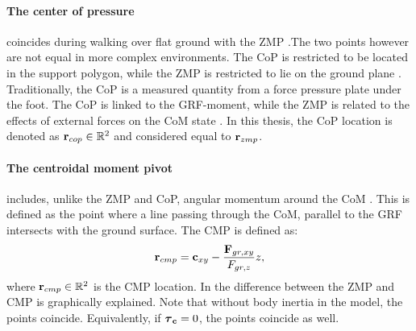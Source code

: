 \paragraph{The center of pressure} coincides during walking over flat ground with the \ac{ZMP} \cite{vukobratovic2004zero}.The two points however are not equal in more complex environments. The \ac{CoP} is restricted to be located in the support polygon, while the \ac{ZMP} is restricted to lie on the ground plane  \cite{sardain2004forces}. Traditionally, the \ac{CoP} is a measured quantity from a force pressure plate under the foot. The \ac{CoP} is linked to the \ac{GRF}-moment, while the \ac{ZMP} is related to the effects of external forces on the \ac{CoM} state \cite{sardain2004forces}. In this thesis, the \ac{CoP} location is denoted as $\mathbf{r}_{cop} \in \mathbb{R}^2$ and considered equal to $\mathbf{r}_{zmp}$.

\paragraph{The centroidal moment pivot} includes, unlike the \ac{ZMP} and \ac{CoP}, angular momentum around the \ac{CoM}  \cite{popovic2005ground}. This is defined as the point where a line passing through the \ac{CoM}, parallel to the \ac{GRF} intersects with the ground surface. The \ac{CMP} is defined as:
\begin{equation}
    \mathbf{r}_{cmp}=\mathbf{c}_{xy}-\frac{\mathbf{F}_{gr,xy}}{F_{gr,z}}z,
    \label{eq:cmp}
\end{equation}
where $\mathbf{r}_{cmp} \in \mathbb{R}^2$ is the \ac{CMP} location. In  the difference between the \ac{ZMP} and \ac{CMP} is graphically explained. Note that without body inertia in the model, the points coincide. Equivalently, if $\boldsymbol{\tau}_{\mathbf{c}}=0$, the points coincide as well.


